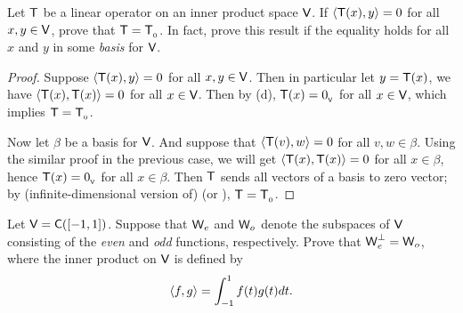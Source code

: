 \begin{exercise} \label{exercise 6.2.17}
Let \(\textsf{T}\) be a linear operator on an inner product space \(\textsf{V}\).
If \(\left< \textsf{T}(x), y \right> = 0\) for all \(x, y \in \textsf{V}\), prove that \(\textsf{T} = \textsf{T}_{_0}\).
In fact, prove this result if the equality holds for all \(x\) and \(y\) in some \emph{basis} for \(\textsf{V}\).
\end{exercise}

\begin{proof}
Suppose \(\left< \textsf{T}(x), y \right> = 0\) for all \(x, y \in \textsf{V}\).
Then in particular let \(y = \textsf{T}(x)\), we have \(\left< \textsf{T}(x), \textsf{T}(x) \right> = 0\) for all \(x \in \textsf{V}\).
Then by (d), \(\textsf{T}(x) = 0_{_{\textsf{V}}}\) for all \(x \in \textsf{V}\), which implies \(\textsf{T} = \textsf{T}_{_0}\).

Now let \(\beta\) be a basis for \(\textsf{V}\).
And suppose that \(\left< \textsf{T}(v), w \right> = 0\) for all \(v, w \in \beta\).
Using the similar proof in the previous case, we will get \(\left< \textsf{T}(x), \textsf{T}(x) \right> = 0\) for all \(x \in \beta\), hence \(\textsf{T}(x) = 0_{_{\textsf{V}}}\) for all \(x \in \beta\).
Then \(\textsf{T}\) sends all vectors of a basis to zero vector; by (infinite-dimensional version of)  (or ), \(\textsf{T} = \textsf{T}_{_0}\).
\end{proof}

\begin{exercise} \label{exercise 6.2.18}
Let \(\textsf{V} = \textsf{C}([-1, 1])\).
Suppose that \(\textsf{W}_e\) and \(\textsf{W}_o\) denote the subspaces of \(\textsf{V}\) consisting of the \emph{even} and \emph{odd} functions, respectively.
Prove that \(\textsf{W}_e^{\perp} = \textsf{W}_o\), where the inner product on \(\textsf{V}\) is defined by
\[
    \left< f, g \right> = \int_{-1}^1 f(t) g(t) dt.
\]
\end{exercise}

